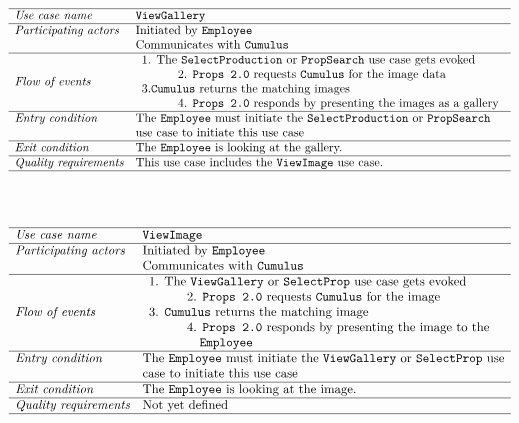 \documentclass[12pt]{article}
\begin{document}
\[
\begin{array}{ll}
\hline
\textit{Use case name} & \texttt{ViewGallery} \\
\hline
\textit{Participating actors} & \text{Initiated by \texttt{Employee}}\\ &
\text{Communicates with \texttt{Cumulus}}\\
\hline
\textit{Flow of events} & 
\begin{array}{l}
\text{1. The \texttt{SelectProduction} or \texttt{PropSearch} use case gets evoked}\\
\quad \quad \quad \text{2. \texttt{Props 2.0} requests \texttt{Cumulus} for the image data}\\
3.\text{\texttt{Cumulus} returns the matching images}\\
\quad \quad \quad \text{4. \texttt{Props 2.0} responds by presenting the images as a gallery}
\end{array} \\
\hline
\textit{Entry condition} &
\text{The \texttt{Employee} must initiate the \texttt{SelectProduction} or \texttt{PropSearch}}\\ &
\text{use case to initiate this use case}\\
\hline
\textit{Exit condition} & \text{The \texttt{Employee} is looking at the gallery.} \\
\hline
\textit{Quality requirements} & \text{This use case includes the \texttt{ViewImage} use case.} \\
\hline
\end{array}
\]
\\\\
\[
\begin{array}{ll}
\hline
\textit{Use case name} & \texttt{ViewImage} \\
\hline
\textit{Participating actors} & \text{Initiated by \texttt{Employee}}\\ &
\text{Communicates with \texttt{Cumulus}}\\
\hline
\textit{Flow of events} & 
\begin{array}{l}
\text{1. The \texttt{ViewGallery} or \texttt{SelectProp} use case gets evoked}\\
\quad \quad \quad \text{2. \texttt{Props 2.0} requests \texttt{Cumulus} for the image}\\
\text{3. \texttt{Cumulus} returns the matching image}\\
\quad \quad \quad \text{4. \texttt{Props 2.0} responds by presenting the image to the}\\ \quad \quad \quad \quad\texttt{Employee}
\end{array} \\
\hline
\textit{Entry condition} &
\text{The \texttt{Employee} must initiate the \texttt{ViewGallery} or \texttt{SelectProp} use}\\ &
\text{case to initiate this use case}\\
\hline
\textit{Exit condition} & \text{The \texttt{Employee} is looking at the image.} \\
\hline
\textit{Quality requirements} & \text{Not yet defined} \\
\hline
\end{array}
\]
\end{document}
